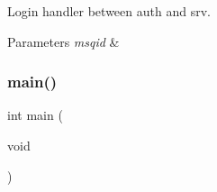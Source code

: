 Login handler between auth and srv. 


\begin{DoxyParams}{Parameters}
{\em msqid} & \\
\hline
\end{DoxyParams}
\mbox{\label{file_8c_a840291bc02cba5474a4cb46a9b9566fe}} 
\subsubsection{main()}
{\footnotesize\ttfamily int main (\begin{DoxyParamCaption}\item[{void}]{ }\end{DoxyParamCaption})}

